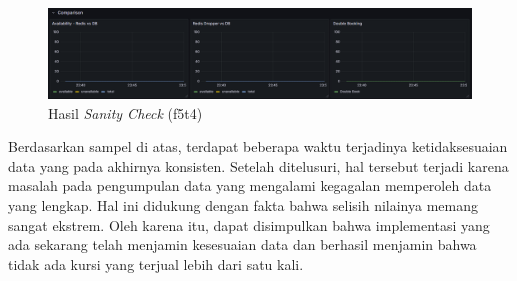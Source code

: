 \begin{figure}[htbp]
    \centering
    \includegraphics[width=1\textwidth]{resources/chapter-4/sanity-f5t4.png}
    \caption{Hasil \textit{Sanity Check} (f5t4)}
    \label{fig:sanity-f5t4}
\end{figure}

Berdasarkan sampel di atas, terdapat beberapa waktu terjadinya ketidaksesuaian data yang pada akhirnya konsisten. Setelah ditelusuri, hal tersebut terjadi karena masalah pada pengumpulan data yang mengalami kegagalan memperoleh data yang lengkap. Hal ini didukung dengan fakta bahwa selisih nilainya memang sangat ekstrem. Oleh karena itu, dapat disimpulkan bahwa implementasi yang ada sekarang telah menjamin kesesuaian data dan berhasil menjamin bahwa tidak ada kursi yang terjual lebih dari satu kali.
